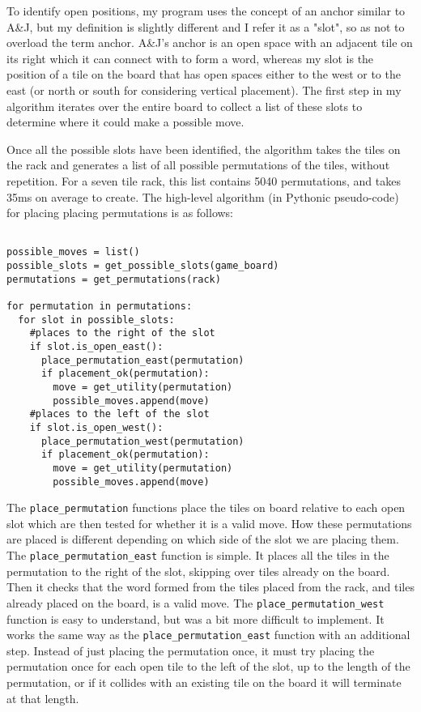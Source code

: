 \documentclass[letterpaper]{article}
\begin{document}
To identify open positions, my program uses the concept of an anchor similar to A\&J, but my definition is slightly different and I refer it as a "slot", so as not to overload the term anchor. A\&J's anchor is an open space with an adjacent tile on its right which it can connect with to form a word, whereas my slot is the position of a tile on the board that has open spaces either to the west or to the east (or north or south for considering vertical placement). The first step in my algorithm iterates over the entire board to collect a list of these slots to determine where it could make a possible move.

Once all the possible slots have been identified, the algorithm takes the tiles on the rack and generates a list of all possible permutations of the tiles, without repetition. For a seven tile rack, this list contains 5040 permutations, and takes 35ms on average to create. The high-level algorithm (in Pythonic pseudo-code) for placing placing permutations is as follows:

\lstset{language=Python}
\begin{lstlisting}[frame=single, breaklines=true]  % Start your code-block

possible_moves = list()
possible_slots = get_possible_slots(game_board)
permutations = get_permutations(rack)

for permutation in permutations:
  for slot in possible_slots:
    #places to the right of the slot
    if slot.is_open_east():
      place_permutation_east(permutation)
      if placement_ok(permutation):
        move = get_utility(permutation)
        possible_moves.append(move)
    #places to the left of the slot
    if slot.is_open_west():
      place_permutation_west(permutation)
      if placement_ok(permutation):
        move = get_utility(permutation)
        possible_moves.append(move)
\end{lstlisting}



The \texttt{place\_permutation} functions place the tiles on board relative to each open slot which are then tested for whether it is a valid move. How these permutations are placed is different depending on which side of the slot we are placing them. The \texttt{place\_permutation\_east} function is simple. It places all the tiles in the permutation to the right of the slot, skipping over tiles already on the board. Then it checks that the word formed from the tiles placed from the rack, and tiles already placed on the board, is a valid move. The \texttt{place\_permutation\_west} function is easy to understand, but was a bit more difficult to implement. It works the same way as the \texttt{place\_permutation\_east} function with an additional step. Instead of just placing the permutation once, it must try placing the permutation once for each open tile to the left of the slot, up to the length of the permutation, or if it collides with an existing tile on the board it will terminate at that length.
\end{document}
